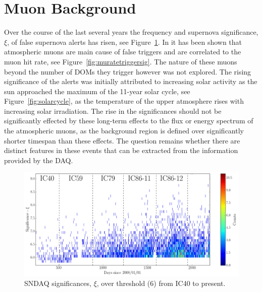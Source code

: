 \section{Muon Background}

Over the course of the last several years the frequency and supernova significance, $\xi$, of false supernova alerts has risen, see Figure~\ref{fig:SNDAQtriggershisto}. In \cite{vbaumaster} it has been shown that atmospheric muons are main cause of false triggers and are correlated to the muon hit rate, see Figure~\ref{fig:muratetriggersig}. The nature of these muons beyond the number of DOMs they trigger however was not explored. The rising significance of the alerts was initially attributed to increasing solar activity as the sun approached the maximum of the 11-year solar cycle, see Figure~\ref{fig:solarcycle}, as the temperature of the upper atmosphere rises with increasing solar irradiation. The rise in the significances should not be significantly effected by these long-term effects to the flux or energy spectrum of the atmospheric muons, as the background region is defined over significantly shorter timespan than these effects. The question remains whether there are distinct features in these events that can be extracted from the information provided by the DAQ. 

\begin{figure}[h]
  \begin{center}
    \includegraphics[width=1\textwidth]{./figures/IC40IC863AlertsSigmavsTwebsiteparser.png}
  \end{center}
  \caption{SNDAQ significances, $\xi$, over threshold (6) from IC40 to present. \label{fig:SNDAQtriggershisto}}   
\end{figure}


